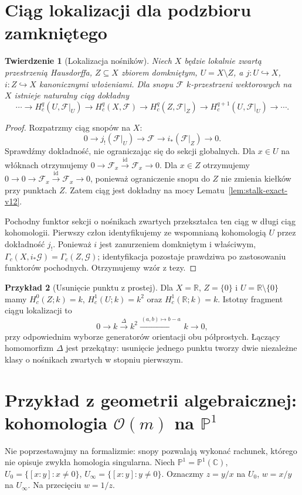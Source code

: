 \documentclass[11pt,a4paper,oneside]{report}
\newcommand{\R}{\mathbb{R}}
\newcommand{\C}{\mathbb{C}}
\newcommand{\id}{\mathrm{id}}
\theoremstyle{plain}
\newtheorem{twierdzenie}{Twierdzenie}[section]
\theoremstyle{definition}
\newtheorem{przyklad}[twierdzenie]{Przykład}
\theoremstyle{remark}
\begin{document}
\section{Ciąg lokalizacji dla podzbioru zamkniętego}
\begin{twierdzenie}[Lokalizacja nośników]
\label{thm:localization-v12}
Niech $X$ będzie lokalnie zwartą przestrzenią Hausdorffa,
$Z\subseteq X$ zbiorem domkniętym, $U=X\setminus Z$,
a $j:U\hookrightarrow X$, $i:Z\hookrightarrow X$
kanonicznymi włożeniami. Dla snopu $\mathcal F$
$k$-przestrzeni wektorowych na $X$ istnieje naturalny
ciąg dokładny
\[
\cdots\to H_c^q(U,\mathcal F|_U)\to H_c^q(X,\mathcal F)
\to H_c^q(Z,\mathcal F|_Z)
\to H_c^{q+1}(U,\mathcal F|_U)\to\cdots.
\]
\end{twierdzenie}
\begin{proof}
Rozpatrzmy ciąg snopów na $X$:
\[
0\longrightarrow j_!(\mathcal F|_U)
\longrightarrow\mathcal F\longrightarrow i_*(\mathcal F|_Z)
\longrightarrow0.
\]
Sprawdźmy dokładność, nie ograniczając się do sekcji globalnych.
Dla $x\in U$ na włóknach otrzymujemy
$0\to\mathcal F_x\xrightarrow{\id}\mathcal F_x\to0$.
Dla $x\in Z$ otrzymujemy
$0\to0\to\mathcal F_x\xrightarrow{\id}\mathcal F_x\to0$,
ponieważ ograniczenie snopu do $Z$ nie zmienia
kiełków przy punktach $Z$. Zatem ciąg jest dokładny
na mocy Lematu~\ref{lem:stalk-exact-v12}.

Pochodny funktor sekcji o nośnikach zwartych
przekształca ten ciąg w długi ciąg kohomologii.
Pierwszy człon identyfikujemy ze wspomnianą
kohomologią $U$ przez dokładność $j_!$.
Ponieważ $i$ jest zanurzeniem domkniętym i właściwym,
$\Gamma_c(X,i_*\mathcal G)=\Gamma_c(Z,\mathcal G)$;
identyfikacja pozostaje prawdziwa po zastosowaniu
funktorów pochodnych. Otrzymujemy wzór z tezy.
\end{proof}

\begin{przyklad}[Usunięcie punktu z prostej]
Dla $X=\R$, $Z=\{0\}$ i $U=\R\setminus\{0\}$ mamy
$H_c^0(Z;k)=k$, $H_c^1(U;k)=k^2$ oraz
$H_c^1(\R;k)=k$. Istotny fragment ciągu lokalizacji to
\[
0\longrightarrow k\xrightarrow{\Delta}k^2
\xrightarrow{\,(a,b)\mapsto b-a\,}k\longrightarrow0,
\]
przy odpowiednim wyborze generatorów orientacji
obu półprostych. Łączący homomorfizm $\Delta$
jest przekątny: usunięcie jednego punktu tworzy dwie
niezależne klasy o nośnikach zwartych w stopniu pierwszym.
\end{przyklad}

\section{Przykład z geometrii algebraicznej: kohomologia \texorpdfstring{$\mathcal O(m)$}{O(m)} na \texorpdfstring{$\mathbb P^1$}{P1}}
\label{sec:p1-sheaf-v12}
Nie poprzestawajmy na formalizmie: snopy pozwalają
wykonać rachunek, którego nie opisuje zwykła homologia
singularna. Niech $\mathbb P^1=\mathbb P^1(\C)$,
$U_0=\{[x:y]:x\ne0\}$, $U_\infty=\{[x:y]:y\ne0\}$.
Oznaczmy $z=y/x$ na $U_0$, $w=x/y$ na $U_\infty$.
Na przecięciu $w=1/z$.
\end{document}
